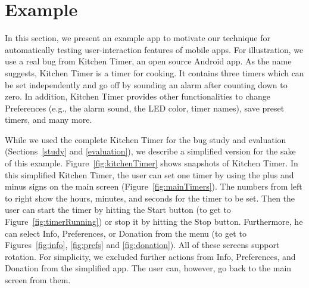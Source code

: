 \section{Example}
\label{example}

In this section, we present an example app to motivate our technique for automatically testing %
user-interaction features of mobile apps. %
For illustration, %
we use a real bug from Kitchen Timer, an open source Android app. As the name suggests, Kitchen Timer is a timer for cooking. It contains three timers which can be set independently and go off by sounding an alarm after counting down to zero. In addition, Kitchen Timer provides other functionalities to change Preferences (e.g., the alarm sound, the LED color, timer names), save preset timers, and many more. 

While we used the complete Kitchen Timer for the bug study and evaluation (Sections~\ref{study} and \ref{evaluation}), we describe a simplified version for the sake of this example. Figure~\ref{fig:kitchenTimer} shows snapshots of Kitchen Timer. In this simplified Kitchen Timer, the user can set one timer by using the plus and minus signs on the main screen (Figure~\ref{fig:mainTimers}). The numbers from left to right show the hours, minutes, and seconds for the timer to be set. Then the user can start the timer by hitting the Start button (to get to Figure~\ref{fig:timerRunning}) or stop it by hitting the Stop button. Furthermore, he can select Info, Preferences, or Donation from the menu (to get to Figures~\ref{fig:info}, \ref{fig:prefs} and \ref{fig:donation}). All of these screens support rotation. For simplicity, we excluded further actions from Info, Preferences, and Donation from the simplified app. The user can, however, go back to the main screen from them.

